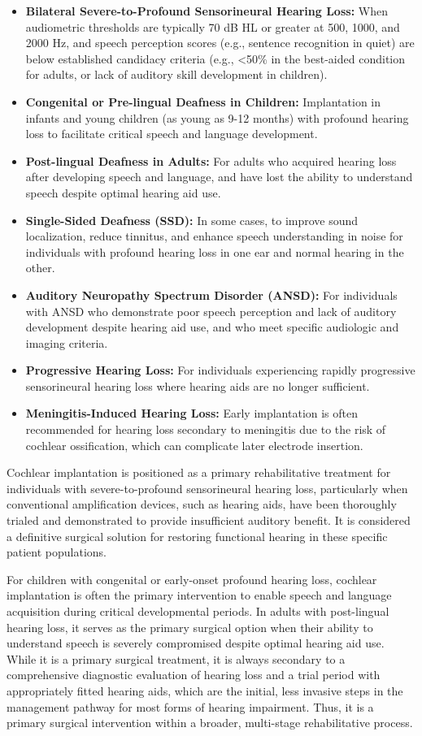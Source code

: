 \begin{itemize}
  \item \textbf{Bilateral Severe-to-Profound Sensorineural Hearing Loss:} When audiometric thresholds are typically 70 dB HL or greater at 500, 1000, and 2000 Hz, and speech perception scores (e.g., sentence recognition in quiet) are below established candidacy criteria (e.g., <50\% in the best-aided condition for adults, or lack of auditory skill development in children).
  \item \textbf{Congenital or Pre-lingual Deafness in Children:} Implantation in infants and young children (as young as 9-12 months) with profound hearing loss to facilitate critical speech and language development.
  \item \textbf{Post-lingual Deafness in Adults:} For adults who acquired hearing loss after developing speech and language, and have lost the ability to understand speech despite optimal hearing aid use.
  \item \textbf{Single-Sided Deafness (SSD):} In some cases, to improve sound localization, reduce tinnitus, and enhance speech understanding in noise for individuals with profound hearing loss in one ear and normal hearing in the other.
  \item \textbf{Auditory Neuropathy Spectrum Disorder (ANSD):} For individuals with ANSD who demonstrate poor speech perception and lack of auditory development despite hearing aid use, and who meet specific audiologic and imaging criteria.
  \item \textbf{Progressive Hearing Loss:} For individuals experiencing rapidly progressive sensorineural hearing loss where hearing aids are no longer sufficient.
  \item \textbf{Meningitis-Induced Hearing Loss:} Early implantation is often recommended for hearing loss secondary to meningitis due to the risk of cochlear ossification, which can complicate later electrode insertion.
\end{itemize}

Cochlear implantation is positioned as a primary rehabilitative treatment for individuals with severe-to-profound sensorineural hearing loss, particularly when conventional amplification devices, such as hearing aids, have been thoroughly trialed and demonstrated to provide insufficient auditory benefit. It is considered a definitive surgical solution for restoring functional hearing in these specific patient populations.

For children with congenital or early-onset profound hearing loss, cochlear implantation is often the primary intervention to enable speech and language acquisition during critical developmental periods. In adults with post-lingual hearing loss, it serves as the primary surgical option when their ability to understand speech is severely compromised despite optimal hearing aid use. While it is a primary surgical treatment, it is always secondary to a comprehensive diagnostic evaluation of hearing loss and a trial period with appropriately fitted hearing aids, which are the initial, less invasive steps in the management pathway for most forms of hearing impairment. Thus, it is a primary surgical intervention within a broader, multi-stage rehabilitative process.

